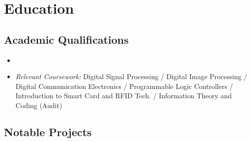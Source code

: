 \documentclass[11pt,a4paper,sans]{moderncv}        %
\begin{document}
\section{Education}

\vspace{5pt}

\subsection{Academic Qualifications}

\vspace{5pt}

\begin{itemize}

\item{}
\item {\textit{Relevant Coursework: }Digital Signal Processing / Digital Image Processing / Digital Communication Electronics / Programmable Logic Controllers / Introduction to Smart Card and RFID Tech. / Information Theory and Coding (Audit)}



\end{itemize}

\vspace{2pt}

\subsection{Notable Projects}

\vspace{5pt}
\end{document}
